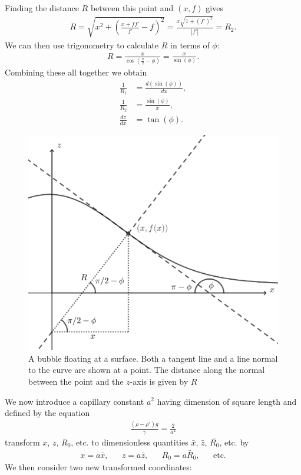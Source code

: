 Finding the distance $R$ between this point and $(x,f)$ gives
\begin{align}
    R=\sqrt{x^2+(\frac{x+ff'}{f'}-f)^2}=\frac{x\sqrt{1+(f')^2}}{|f'|}=R_2.
\end{align}
We can then use trigonometry to calculate $R$ in terms of $\phi$:
\begin{align}
    R=\frac{x}{\cos(\frac{\pi}{2}-\phi)}=\frac{x}{\sin(\phi)}.
\end{align}
Combining these all together we obtain
\begin{align}
    \frac{1}{R_1}&=\frac{d(\sin(\phi))}{dx},\\
    \frac{1}{R_2}&=\frac{\sin(\phi)}{x},\\
    \frac{dz}{dx} &= \tan(\phi).
\end{align}
\begin{figure}
    \centering
    \includegraphics[width=0.75\linewidth]{WriteUp/images/angles and trig.png}
    \caption{A bubble floating at a surface. Both a tangent line and a line normal to the curve are shown at a point. The distance along the normal between the point and the $z$-axis is given by $R$}
    \label{fig:4}
\end{figure}
We now introduce a capillary constant $a^2$ having dimension of square length and defined by the equation
\begin{align}
    \frac{(\rho-\rho')g}{\gamma} = \frac{2}{a^2}
\end{align}
transform $x$, $z$, $R_0$, etc. to dimensionless quantities $\bar{x}$, $\bar{z}$, $\bar{R_0}$, etc. by
\begin{align}
    x=a\bar{x}, && z=a\bar{z}, && R_0=a\bar{R}_0, && \text{etc.}
\end{align}
We then consider two new transformed coordinates:
